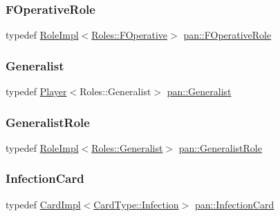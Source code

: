 \mbox{\label{namespacepan_a7b1b888df0832e31a74bfb724e44914a}} 
\subsubsection{\texorpdfstring{F\+Operative\+Role}{FOperativeRole}}
{\footnotesize\ttfamily typedef \hyperlink{classpan_1_1_role_impl}{Role\+Impl}$<$\hyperlink{namespacepan_a5017f84fa51152eae453759537d1ced6a97b293ec5041fbbf87730876a2d388c5}{Roles\+::\+F\+Operative}$>$ \hyperlink{namespacepan_a7b1b888df0832e31a74bfb724e44914a}{pan\+::\+F\+Operative\+Role}}

\mbox{\label{namespacepan_a14b9d4ed4f5f1fd23e2b1ddbe4694af1}} 
\subsubsection{\texorpdfstring{Generalist}{Generalist}}
{\footnotesize\ttfamily typedef \hyperlink{classpan_1_1_player}{Player}$<$Roles\+::\+Generalist$>$ \hyperlink{namespacepan_a14b9d4ed4f5f1fd23e2b1ddbe4694af1}{pan\+::\+Generalist}}

\mbox{\label{namespacepan_aea2d78776fac8fe1832de0f89c365d6a}} 
\subsubsection{\texorpdfstring{Generalist\+Role}{GeneralistRole}}
{\footnotesize\ttfamily typedef \hyperlink{classpan_1_1_role_impl}{Role\+Impl}$<$\hyperlink{namespacepan_a5017f84fa51152eae453759537d1ced6a824390b43737bdd9821c864af71f1f86}{Roles\+::\+Generalist}$>$ \hyperlink{namespacepan_aea2d78776fac8fe1832de0f89c365d6a}{pan\+::\+Generalist\+Role}}

\mbox{\label{namespacepan_ad7a96d727f36749dbd39428e2a007de5}} 
\subsubsection{\texorpdfstring{Infection\+Card}{InfectionCard}}
{\footnotesize\ttfamily typedef \hyperlink{classpan_1_1_card_impl}{Card\+Impl}$<$\hyperlink{namespacepan_a1f7350bfd0421afeabe9fa95c16fa811af0ddc0838281faf6d55e2cf840a2a8ef}{Card\+Type\+::\+Infection}$>$ \hyperlink{namespacepan_ad7a96d727f36749dbd39428e2a007de5}{pan\+::\+Infection\+Card}}

